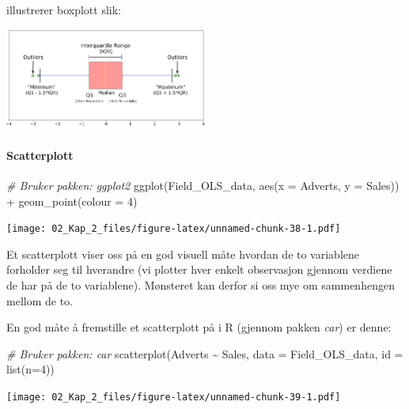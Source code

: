 \documentclass[
]{article}
\newenvironment{Shaded}{\begin{snugshade}}{\end{snugshade}}
\newcommand{\AttributeTok}[1]{\textcolor[rgb]{0.77,0.63,0.00}{#1}}
\newcommand{\CommentTok}[1]{\textcolor[rgb]{0.56,0.35,0.01}{\textit{#1}}}
\newcommand{\DecValTok}[1]{\textcolor[rgb]{0.00,0.00,0.81}{#1}}
\newcommand{\FunctionTok}[1]{\textcolor[rgb]{0.00,0.00,0.00}{#1}}
\newcommand{\NormalTok}[1]{#1}
\newcommand{\SpecialCharTok}[1]{\textcolor[rgb]{0.00,0.00,0.00}{#1}}
\begin{document}
\citet{galarnykUnderstandingBoxplots2018} illustrerer boxplott slik:

\includegraphics[width=0.5\textwidth,height=\textheight]{Boxplott.png}

\hypertarget{scatterplott}{%
\paragraph{Scatterplott}\label{scatterplott}}

\begin{Shaded}
\begin{Highlighting}[]
\CommentTok{\# Bruker pakken: ggplot2}
\FunctionTok{ggplot}\NormalTok{(Field\_OLS\_data, }\FunctionTok{aes}\NormalTok{(}\AttributeTok{x =}\NormalTok{ Adverts, }\AttributeTok{y =}\NormalTok{ Sales)) }\SpecialCharTok{+}
  \FunctionTok{geom\_point}\NormalTok{(}\AttributeTok{colour =} \DecValTok{4}\NormalTok{)}
\end{Highlighting}
\end{Shaded}

\texttt{[image: 02\_Kap\_2\_files/figure-latex/unnamed-chunk-38-1.pdf]}

Et scatterplott viser oss på en god visuell måte hvordan de to variablene forholder seg til hverandre (vi plotter hver enkelt observasjon gjennom verdiene de har på de to variablene). Mønsteret kan derfor si oss mye om sammenhengen mellom de to.

En god måte å fremstille et scatterplott på i R (gjennom pakken \emph{car}) er denne:

\begin{Shaded}
\begin{Highlighting}[]
\CommentTok{\# Bruker pakken: car}
\FunctionTok{scatterplot}\NormalTok{(Adverts }\SpecialCharTok{\textasciitilde{}}\NormalTok{ Sales, }\AttributeTok{data =}\NormalTok{ Field\_OLS\_data, }\AttributeTok{id =} \FunctionTok{list}\NormalTok{(}\AttributeTok{n=}\DecValTok{4}\NormalTok{))}
\end{Highlighting}
\end{Shaded}

\texttt{[image: 02\_Kap\_2\_files/figure-latex/unnamed-chunk-39-1.pdf]}
\end{document}
